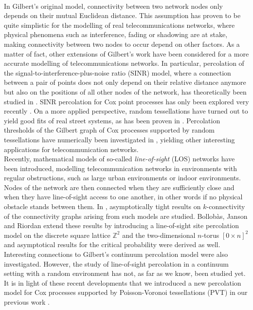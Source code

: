 \documentclass[10pt,a4paper]{amsart}
\theoremstyle{exampstyle}
\theoremstyle{exampnotations}
\begin{document}
\\ \indent In Gilbert's original model, connectivity between two network nodes only depends on their mutual Euclidean distance. This assumption has proven to be quite simplistic for the modelling of real telecommunications networks, where physical phenomena such as interference, fading or shadowing are at stake, making connectivity between two nodes to occur depend on other factors. As a matter of fact, other extensions of Gilbert's work have been considered for a more accurate modelling of telecommunications networks. In particular, percolation of the signal-to-interference-plus-noise ratio (SINR) model, where a connection between a pair of points does not only depend on their relative distance anymore but also on the positions of all other nodes of the network, has theoretically been studied in \cite{dousse2006percolation}. SINR percolation for Cox point processes has only been explored very recently \cite{tobias2018signal}. On a more applied perspective, random tessellations have turned out to yield good fits of real street systems, as has been proven in \cite{gloaguen2006fitting}. Percolation thresholds of the Gilbert graph of Cox processes supported by random tessellations have numerically been investigated in \cite{cali2018percolation}, yielding other interesting applications for telecommunication networks. 
\\ \indent Recently, mathematical models of so-called \emph{line-of-sight} (LOS) networks have been introduced, modelling telecommunication networks in environments with regular obstructions, such as large urban environments or indoor environments. Nodes of the network are then connected when they are sufficiently close %
and when they have line-of-sight access to one another, in other words if no physical obstacle stands between them. In \cite{frieze2009line}, asymptotically tight results on $k$-connectivity of the connectivity graphs arising from such models are studied. Bollobàs, Janson and Riordan \cite{bollobas2009line} extend these results by introducing a line-of-sight site percolation model on the discrete square lattice $\mathbb{Z}^{2}$ and the two-dimensional $n$-torus $\left[0 \times n \right]^2$ and asymptotical results for the critical probability were derived as well. Interesting connections to Gilbert's continuum percolation model were also investigated. However, the study of line-of-sight percolation in a continuum setting with a random environment has not, %
as far as we know, been studied yet. \\ \indent It is in light of these recent developments that we introduced a new percolation model for Cox processes supported by Poisson-Voronoi tessellations (PVT) in our previous work \cite{LeGal1904:Influence}. 
\end{document}
